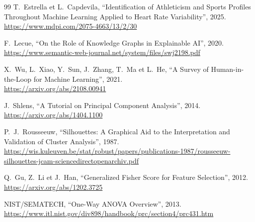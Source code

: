 \documentclass[12pt,a4paper]{article}
\begin{document}
\begin{thebibliography}{99}
T.~Estrella et L.~Capdevila,
``Identification of Athleticism and Sports Profiles Throughout Machine
Learning Applied to Heart Rate Variability'',
2025.\\
\url{https://www.mdpi.com/2075-4663/13/2/30}

F.~Lecue,
``On the Role of Knowledge Graphs in Explainable AI'',
2020.\\
\url{https://www.semantic-web-journal.net/system/files/swj2198.pdf}

X.~Wu, L.~Xiao, Y.~Sun, J.~Zhang, T.~Ma et L.~He,
``A Survey of Human-in-the-Loop for Machine Learning'',
2021.\\
\url{https://arxiv.org/abs/2108.00941}

J.~Shlens,
``A Tutorial on Principal Component Analysis'',
2014.\\
\url{https://arxiv.org/abs/1404.1100}

P.~J.~Rousseeuw,
``Silhouettes: A Graphical Aid to the Interpretation and Validation of Cluster Analysis'',
1987.\\
\url{https://wis.kuleuven.be/stat/robust/papers/publications-1987/rousseeuw-silhouettes-jcam-sciencedirectopenarchiv.pdf}

Q.~Gu, Z.~Li et J.~Han,
``Generalized Fisher Score for Feature Selection'',
2012.\\
\url{https://arxiv.org/abs/1202.3725}

NIST/SEMATECH,
``One-Way ANOVA Overview'',
2013.\\
\url{https://www.itl.nist.gov/div898/handbook/prc/section4/prc431.htm}

\end{thebibliography}
\end{document}
